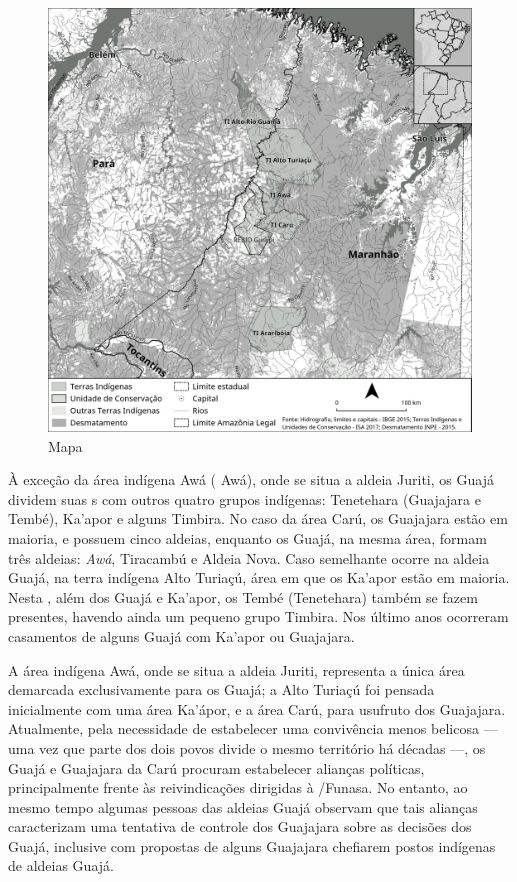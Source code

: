 \begin{figure}[H]
\centering
  \includegraphics[width=\textwidth]{./imgs/mapa_livro_uira}
\caption{Mapa}
\end{figure}

À exceção da área indígena Awá ( Awá), onde se situa a aldeia Juriti,
os Guajá dividem suas s com outros quatro grupos indígenas: Tenetehara
(Guajajara e Tembé), Ka'apor e alguns Timbira. No caso da área Carú, os
Guajajara estão em maioria, e possuem cinco aldeias, enquanto os Guajá,
na mesma área, formam três aldeias: \emph{Awá}, Tiracambú e Aldeia Nova.
Caso semelhante ocorre na aldeia Guajá, na terra indígena Alto Turiaçú,
área em que os Ka'apor estão em maioria. Nesta , além dos Guajá e
Ka'apor, os Tembé (Tenetehara) também se fazem presentes, havendo ainda
um pequeno grupo Timbira. Nos último anos ocorreram casamentos de alguns
Guajá com Ka'apor ou Guajajara.

A área indígena Awá, onde se situa a aldeia Juriti, representa a única
área demarcada exclusivamente para os Guajá; a  Alto Turiaçú foi
pensada inicialmente com uma área Ka'ápor, e a área Carú, para usufruto
dos Guajajara. Atualmente, pela necessidade de estabelecer uma
convivência menos belicosa --- uma vez que parte dos dois povos divide o
mesmo território há décadas ---, os Guajá e Guajajara da  Carú procuram
estabelecer alianças políticas, principalmente frente às reivindicações
dirigidas à /Funasa. No entanto, ao mesmo tempo algumas pessoas das
aldeias Guajá observam que tais alianças caracterizam uma tentativa de
controle dos Guajajara sobre as decisões dos Guajá, inclusive com
propostas de alguns Guajajara chefiarem postos indígenas de aldeias
Guajá.

